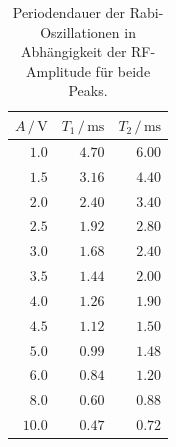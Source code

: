 \begin{table}
    \centering
    \caption{Periodendauer der Rabi-Oszillationen in Abhängigkeit der RF-Amplitude für beide Peaks.}
    \label{tab:A}
    \begin{tabular}{r r r}
        \toprule
        $A \,/\, \unit{\volt}$ & $T_\text{1} \,/\, \unit{\milli\second}$ & $T_\text{2} \,/\, \unit{\milli\second}$\\
        \midrule
        $1.0 $ & $4.70 $ & $6.00 $\\
        $1.5 $ & $3.16 $ & $4.40 $\\
        $2.0 $ & $2.40 $ & $3.40 $\\
        $2.5 $ & $1.92 $ & $2.80 $\\
        $3.0 $ & $1.68 $ & $2.40 $\\
        $3.5 $ & $1.44 $ & $2.00 $\\
        $4.0 $ & $1.26 $ & $1.90 $\\
        $4.5 $ & $1.12 $ & $1.50 $\\
        $5.0 $ & $0.99 $ & $1.48 $\\
        $6.0 $ & $0.84 $ & $1.20 $\\
        $8.0 $ & $0.60 $ & $0.88 $\\
        $10.0$ & $ 0.47$ & $0.72 $\\
        \bottomrule
    \end{tabular}
\end{table}